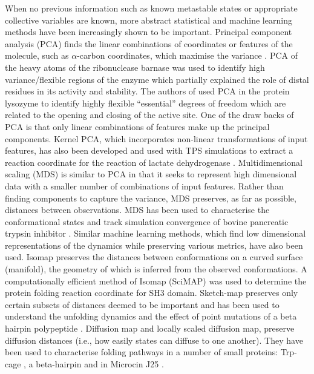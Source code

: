 When no previous information such as known metastable states or appropriate collective variables are known, more abstract statistical and machine learning methods have been increasingly shown to be important. Principal component analysis (PCA) finds the linear combinations of coordinates or features of the molecule, such as $\alpha$-carbon coordinates, which maximise the variance \cite{pearson1901liii}. PCA of the heavy atoms of the ribonuclease barnase \cite{noldeEssentialDomainMotions2002} was used to identify high variance/flexible regions of the enzyme which partially explained the role of distal residues in its activity and stability. The authors of \cite{amadeiEssentialDynamicsProteins1993a} used PCA in the  protein lysozyme to identify highly flexible ``essential'' degrees of freedom which are related to the opening and closing of the active site.  One of the draw backs of PCA is that only linear combinations of features make up the principal components.  Kernel PCA, which incorporates non-linear transformations of input features, has also been developed and used with TPS simulations to extract a reaction coordinate for the reaction of lactate  dehydrogenase \cite{antoniouIdentificationReactionCoordinate2011,quaytmanReactionCoordinateEnzymatic2007}. Multidimensional scaling (MDS) \cite{borg1997modern} is similar to PCA in that it seeks to represent high dimensional data with a smaller number of  combinations of input features. Rather than finding components to capture the variance, MDS preserves, as far as possible, distances between observations.  MDS has been used to characterise the conformational states and track simulation convergence of bovine pancreatic trypsin inhibitor \cite{troyerProteinConformationalLandscapes1995}. Similar machine learning methods, which find low dimensional representations of the dynamics while preserving various metrics, have also been used.  Isomap \cite{tenenbaumGlobalGeometricFramework2000} preserves the distances between conformations on a curved surface (manifold), the geometry of which is inferred from the observed conformations. A computationally efficient method of Isomap (SciMAP) \cite{dasLowdimensionalFreeenergyLandscapes2006} was used to determine the protein folding reaction coordinate for SH3 domain. Sketch-map \cite{ceriottiSimplifyingRepresentationComplex201} preserves only certain subsets of distances deemed to be important and has been used to understand the unfolding dynamics and the effect of point mutations of a beta hairpin polypeptide \cite{ardevolProbingUnfoldedConfigurations2015}. 
Diffusion map \cite{fergusonNonlinearDimensionalityReduction2011} and locally scaled diffusion map, preserve diffusion distances (i.e., how easily states can diffuse to one another). They have been used to characterise folding pathways in a number of small proteins:  Trp-cage \cite{kimSystematicCharacterizationProtein2015}, a beta-hairpin \cite{zhengDelineationFoldingPathways2011} and in Microcin J25 \cite{fergusonNonlinearDimensionalityReduction2011}. 


